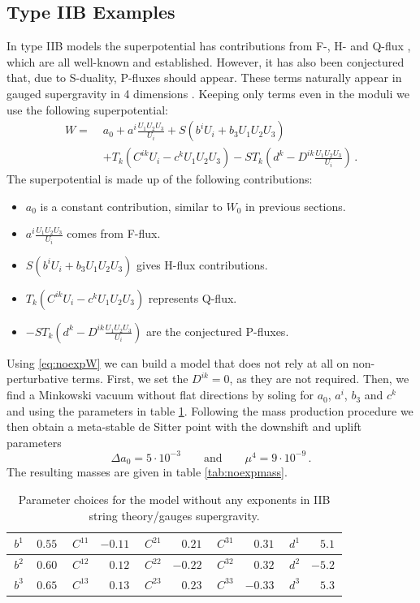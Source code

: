 \documentclass[12pt]{report}
\newcommand{\be}{\begin{equation}}
\newcommand{\ee}{\end{equation}}
\newcommand{\bea}{\begin{equation}\begin{aligned}}
\newcommand{\eea}{\end{aligned}\end{equation}}
\begin{document}
\subsection{Type IIB Examples}
In type IIB models the superpotential has contributions from F-, H- and Q-flux \cite{Aldazabal:2006up,Dibitetto:2011gm,Blaback:2013ht}, which are all well-known and established. However, it has also been conjectured that, due to S-duality, P-fluxes should appear. These terms naturally appear in gauged supergravity in 4 dimensions \cite{Dibitetto:2011gm}. Keeping only terms even in the moduli we use the following superpotential:
\bea
\label{eq:noexpW}
W =\; &a_0 + a^i \frac{U_1 U_2 U_3}{U_i} + S \left( b^i U_i + b_3 U_1 U_2 U_3 \right) \\
&+ T_k \left( C^{ik}U_i - c^k U_1 U_2 U_3\right) - S T_k \left( d^k -D^{ik}\frac{U_1 U_2 U_3}{U_i}\right)\,.
\eea
The superpotential is made up of the following contributions:
\begin{itemize}
\item $a_0$ is a constant contribution, similar to $W_0$ in previous sections.
\item $a^i \frac{U_1 U_2 U_3}{U_i}$ comes from F-flux.
\item $S \left( b^i U_i + b_3 U_1 U_2 U_3 \right)$ gives H-flux contributions.
\item $T_k \left( C^{ik}U_i - c^k U_1 U_2 U_3\right)$ represents Q-flux.
\item $- S T_k \left( d^k -D^{ik}\frac{U_1 U_2 U_3}{U_i}\right)$ are the conjectured P-fluxes.
\end{itemize}
Using \eqref{eq:noexpW} we can build a model that does not rely at all on non-perturbative terms. First, we set the $D^{ik}=0$, as they are not required. Then, we find a Minkowski vacuum without flat directions by soling for $a_0$, $a^i$, $b_3$ and $c^k$ and using the parameters in table \ref{tab:noexppara}. Following the mass production procedure we then obtain a meta-stable de Sitter point with the downshift and uplift parameters
\be 
\Delta a_0 = 5 \cdot 10^{-3}\qquad \text{and} \qquad \mu^4 = 9\cdot 10^{-9}\,.
\ee
The resulting masses are given in table \ref{tab:noexpmass}.
\begin{table}[htb]
\center
\begin{tabular}{|r|r||r|r||r|r||r|r||r|r|}\hline
$\,b^{1}$ & $\, 0.55 \,$  & $\,C^{11}$ & $ -0.11 \,$ & $\,C^{21}$ & $\, 0.21 \,$ & $\,C^{31}$ & $\, 0.31 \,$ & $\,d^{1}$ & $\, 5.1 \,$ \\\hline
$\,b^{2}$ & $\, 0.60 \,$ & $\,C^{12}$ & $\, 0.12 \,$ & $\,C^{22}$ & $ -0.22 \,$ & $\,C^{32}$ & $\, 0.32 \,$ & $\,d^{2}$ & $ -5.2 \,$ \\\hline
$\,b^{3}$ & $\, 0.65 \,$ & $\,C^{13}$ & $\, 0.13 \,$ & $\,C^{23}$ & $\, 0.23 \,$ & $\,C^{33}$ & $ -0.33 \,$ & $\,d^{3}$ & $\, 5.3 \,$ \\\hline
\end{tabular}
\caption{Parameter choices for the model without any exponents in IIB string theory/gauges supergravity.}
\label{tab:noexppara}
\end{table}
\end{document}
